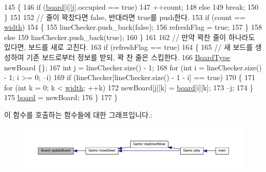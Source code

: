 \begin{DoxyCode}
145             \{
146                 \textcolor{keywordflow}{if} (\mbox{\hyperlink{class_board_ad26aada4f19d2ca0c7bd534e8f466b6b}{board}}[i][j].occupied == \textcolor{keyword}{true})
147                     ++count;
148                 \textcolor{keywordflow}{else}
149                     \textcolor{keywordflow}{break};
150             \}
151 
152             \textcolor{comment}{// 줄이 꽉찼다면 false, 반대라면 true를 push한다.}
153             \textcolor{keywordflow}{if} (count == \mbox{\hyperlink{class_board_a5c5b64d99e3c653c425206d2babf2f97}{width}})
154             \{
155                 lineChecker.push\_back(\textcolor{keyword}{false});
156                 refreshFlag = \textcolor{keyword}{true};
157             \}
158             \textcolor{keywordflow}{else}
159                 lineChecker.push\_back(\textcolor{keyword}{true});
160         \}
161 
162         \textcolor{comment}{// 만약 꽉찬 줄이 하나라도 있다면, 보드를 새로 고친다.}
163         \textcolor{keywordflow}{if} (refreshFlag == \textcolor{keyword}{true})
164         \{
165             \textcolor{comment}{// 새 보드를 생성하여 기존 보드로부터 정보를 받되, 꽉 찬 줄은 스킵한다.}
166             \mbox{\hyperlink{class_board_a84bf794bc185e31e333b78bb003c4bc3}{BoardType}} newBoard \{\};
167             \textcolor{keywordtype}{int} j = lineChecker.size() - 1;
168             \textcolor{keywordflow}{for} (\textcolor{keywordtype}{int} i = lineChecker.size() - 1; i >= 0; --i)
169                 \textcolor{keywordflow}{if} (lineChecker[lineChecker.size() - 1 - i] == \textcolor{keyword}{true})
170                 \{
171                     \textcolor{keywordflow}{for} (\textcolor{keywordtype}{int} k = 0; k < \mbox{\hyperlink{class_board_a5c5b64d99e3c653c425206d2babf2f97}{width}}; ++k)
172                         newBoard[j][k] = \mbox{\hyperlink{class_board_ad26aada4f19d2ca0c7bd534e8f466b6b}{board}}[i][k];
173                     --j;
174                 \}
175             \mbox{\hyperlink{class_board_ad26aada4f19d2ca0c7bd534e8f466b6b}{board}} = newBoard;
176         \}
177 \}
\end{DoxyCode}
이 함수를 호출하는 함수들에 대한 그래프입니다.\+:
\nopagebreak
\begin{figure}[H]
\begin{center}
\leavevmode
\includegraphics[width=350pt]{class_board_a06e5188ef352fc5c0e3957895cef6a89_icgraph}
\end{center}
\end{figure}


